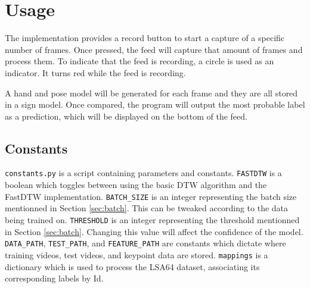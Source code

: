 \documentclass[final,rdr32.tex]{subfiles}
\begin{document}
\section{Usage}

The implementation provides a record button to start a capture of a specific number of frames. Once pressed, the feed will capture that amount of frames and process them. To indicate that the feed is recording, a circle is used as an indicator. It turns red while the feed is recording.

A hand and pose model will be generated for each frame and they are all stored in a sign model. Once compared, the program will output the most probable label as a prediction, which will be displayed on the bottom of the feed.

\subsection{Constants}
\label{sec:constants}

\verb|constants.py| is a script containing parameters and constants.
\verb|FASTDTW| is a boolean which toggles between using the basic DTW algorithm and the FastDTW implementation.
\verb|BATCH_SIZE| is an integer representing the batch size mentionned in Section \ref{sec:batch}. This can be tweaked according to the data being trained on.
\verb|THRESHOLD| is an integer representing the threshold mentionned in Section \ref{sec:batch}. Changing this value will affect the confidence of the model.
\verb|DATA_PATH|, \verb|TEST_PATH|, and \verb|FEATURE_PATH| are constants which dictate where training videos, test videos, and keypoint data are stored.
\verb|mappings| is a dictionary which is used to process the LSA64 dataset, associating its corresponding labels by Id.
\end{document}
